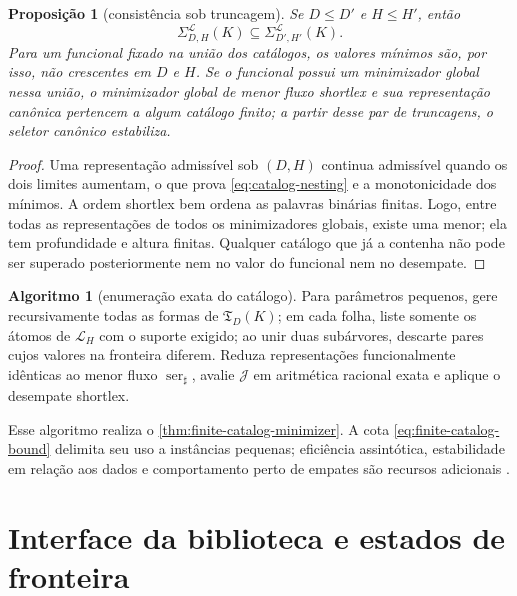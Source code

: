 \documentclass[11pt,a4paper]{article}
\newtheorem{proposition}[theorem]{Proposição}
\theoremstyle{definition}
\newtheorem{algorithm}[theorem]{Algoritmo}
\theoremstyle{remark}
\newcommand{\Library}{\mathcal{L}}
\begin{document}
\begin{proposition}[consistência sob truncagem]
\label{prop:catalog-consistency}
Se $D\le D'$ e $H\le H'$, então
\begin{equation}
 \Sigma_{D,H}^{\Library}(K)
 \subseteq\Sigma_{D',H'}^{\Library}(K).
 \label{eq:catalog-nesting}
\end{equation}
Para um funcional fixado na união dos catálogos, os valores mínimos são, por
isso, não crescentes em $D$ e $H$. Se o funcional possui um minimizador global
nessa união, o minimizador global de menor fluxo shortlex e sua representação
canônica pertencem a algum catálogo finito; a partir desse par de truncagens,
o seletor canônico estabiliza.
\end{proposition}

\begin{proof}
Uma representação admissível sob $(D,H)$ continua admissível quando os dois
limites aumentam, o que prova \eqref{eq:catalog-nesting} e a monotonicidade dos
mínimos. A ordem shortlex bem ordena as palavras binárias finitas. Logo, entre
todas as representações de todos os minimizadores globais, existe uma menor;
ela tem profundidade e altura finitas. Qualquer catálogo que já a contenha não
pode ser superado posteriormente nem no valor do funcional nem no desempate.
\end{proof}

\begin{algorithm}[enumeração exata do catálogo]\label{alg:finite-enumeration}
Para parâmetros pequenos, gere recursivamente todas as formas de
$\mathfrak T_D(K)$; em cada folha, liste somente os átomos de $\Library_H$ com
o suporte exigido; ao unir duas subárvores, descarte pares cujos valores na
fronteira diferem. Reduza representações funcionalmente idênticas ao menor
fluxo $\operatorname{ser}_\sharp$, avalie $\mathcal J$ em aritmética racional
exata e aplique o desempate shortlex.
\end{algorithm}

Esse algoritmo realiza o
\cref{thm:finite-catalog-minimizer}. A cota
\eqref{eq:finite-catalog-bound} delimita seu uso a instâncias pequenas;
eficiência assintótica, estabilidade em relação aos dados e comportamento
perto de empates são recursos adicionais \citep{christof2021}.

\section{Interface da biblioteca e estados de fronteira}
\label{sec:interface}
\end{document}
